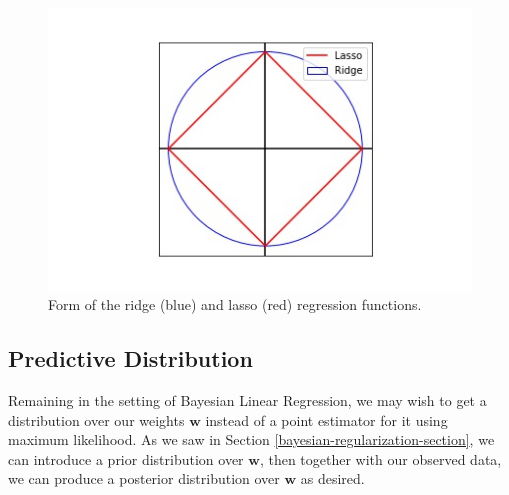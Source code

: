 \begin{figure}
    \centering
    \includegraphics[width=0.5\paperwidth]{../LinearRegression/fig/ridgeandlassoreg_GEN.jpg}
    \caption{Form of the ridge (blue) and lasso (red) regression functions.}
    \label{fig:ridge-and-lasso-reg-fn-form}
\end{figure}

\subsection{Predictive Distribution}
Remaining in the setting of Bayesian Linear Regression, we may wish to get a distribution over our weights $\textbf{w}$ instead of a point estimator for it using maximum likelihood. As we saw in Section \ref{bayesian-regularization-section}, we can introduce a prior distribution over $\textbf{w}$, then together with our observed data, we can produce a posterior distribution over $\textbf{w}$ as desired.

